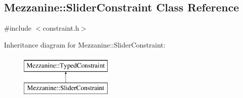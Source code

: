 \hypertarget{classMezzanine_1_1SliderConstraint}{
\subsection{Mezzanine::SliderConstraint Class Reference}
\label{classMezzanine_1_1SliderConstraint}
}


{\ttfamily \#include $<$constraint.h$>$}

Inheritance diagram for Mezzanine::SliderConstraint:\begin{figure}[H]
\begin{center}
\leavevmode
\includegraphics[height=2.000000cm]{classMezzanine_1_1SliderConstraint}
\end{center}
\end{figure}
